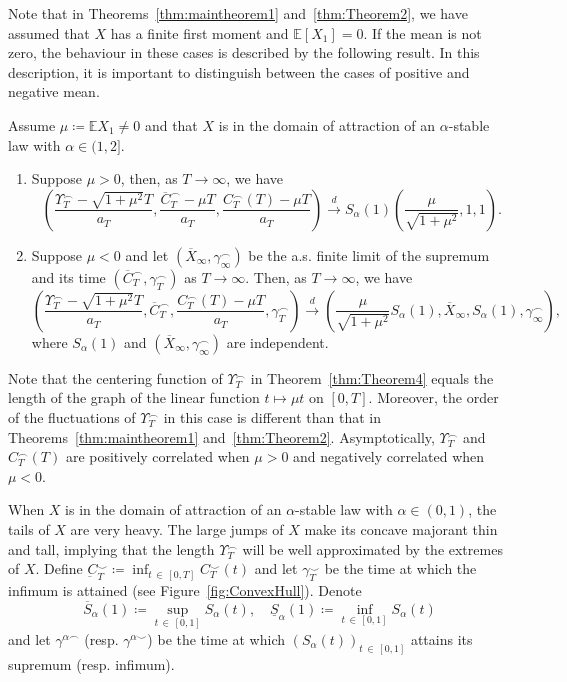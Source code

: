 \documentclass[AHL,Unicode,longabstracts,published]{cedram}
\newcommand\E{\mathds{E}}
\newcommand\1{\mathds{1}}
\newcommand\cid{\xrightarrow{d}}
\newcommand\ov[1]{\overline{#1}}
\newcommand\un[1]{\underline{#1}}
\newcommand*{\alphenumi}{\renewcommand*{\theenumi}{\alph{enumi}}}
\begin{document}
Note that in Theorems~\ref{thm:maintheorem1} and~\ref{thm:Theorem2}, we have assumed that $X$ has a finite first moment and $\E[X_1]=0$. If the mean is not zero, the behaviour in these cases is described by the following result. In this description, it is important to distinguish between the cases of positive and negative mean.

\begin{theo}\label{thm:Theorem4}
Assume $\mu\coloneqq \E X_1 \ne 0$ and that $X$ is in the domain of attraction of an $\alpha$-stable law with $\alpha \in (1,2]$.
\begin{enumerate}\alphenumi
\item\label{theo1.6.a} Suppose $\mu>0$, then, as $T\to\infty$, we have
\[
\left(
\frac{\Upsilon^\frown_T -\sqrt{1+\mu^2}T}{a_T},
\frac{\ov{C}_T^\frown-\mu T}{a_T},
\frac{C_T^\frown(T)-\mu T}{a_T}\right)
\cid S_\alpha(1)\left(
\frac{\mu}{\sqrt{1+\mu^2}},1,1\right).
\]
\item\label{theo1.6.b} Suppose $\mu<0$ and let $(\ov{X}_\infty,\gamma_\infty^\frown)$ be the a.s. finite limit of the supremum and its time $(\ov{C}_T^\frown,\gamma_T^\frown)$ as $T\to\infty$. Then, as $T\to\infty$, we have
\[
\left(
\frac{\Upsilon^\frown_T -\sqrt{1+\mu^2}T}{a_T},
\ov{C}_T^\frown,
\frac{C_T^\frown(T)-\mu T}{a_T},
\gamma_T^\frown\right)
\cid
\left(
\frac{\mu}{\sqrt{1+\mu^2}}S_\alpha(1),
\ov{X}_\infty,S_\alpha(1),\gamma_\infty^\frown\right),
\]
where $S_\alpha(1)$ and $(\ov{X}_\infty,\gamma_\infty^\frown)$ are independent.
\end{enumerate}
\end{theo}

Note that the centering function of $\Upsilon_T^\frown$ in Theorem~\ref{thm:Theorem4} equals the length of the graph of the linear function $t\mapsto\mu t$ on $[0,T]$. Moreover, the order of the fluctuations of $\Upsilon_T^\frown$ in this case is different than that in Theorems~\ref{thm:maintheorem1} and~\ref{thm:Theorem2}. Asymptotically, $\Upsilon_T^\frown$ and $C_T^\frown(T)$ are positively correlated when $\mu>0$ and negatively correlated when $\mu<0$.

When $X$ is in the domain of attraction of an $\alpha$-stable law with $\alpha\in(0,1)$, the tails of $X$ are very heavy. The large jumps of $X$ make its concave majorant thin and tall, implying that the length $\Upsilon_T^\frown$ will be well approximated by the extremes of $X$. Define $\underbar{C}_T^\smile\coloneqq \inf_{t\,\in\,[0,T]}C_T^\smile(t)$ and let $\gamma_T^\smile$ be the time at which the infimum is attained (see Figure~\ref{fig:ConvexHull}). Denote
\[
\ov{S}_\alpha(1)\coloneqq \sup_{t\,\in\,[0,1]}S_\alpha(t),\quad \un{S}_\alpha(1)\coloneqq \inf_{t\,\in\,[0,1]}S_\alpha(t)
\]
and let $\gamma^{\alpha\frown}$ (resp. $\gamma^{\alpha\smile}$) be the time at which $(S_\alpha(t))_{t\,\in\,[0,1]}$ attains its supremum (resp. infi\-mum).
\end{document}
